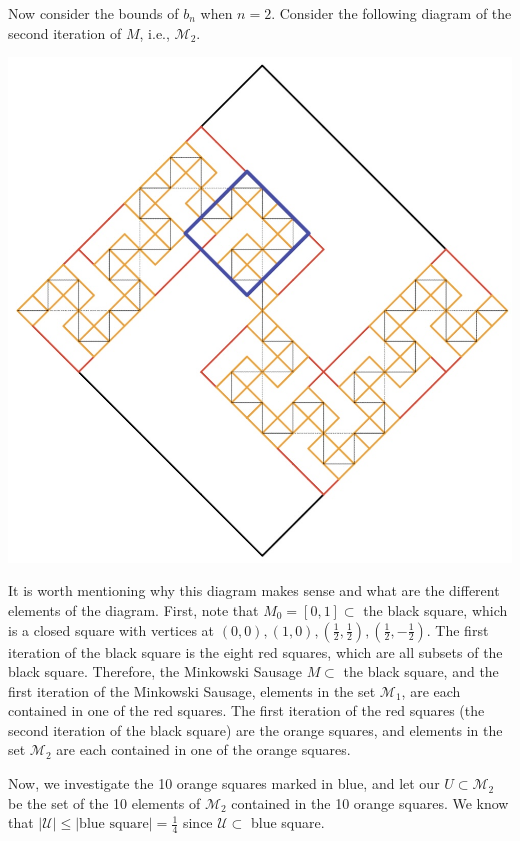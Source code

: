 Now consider the bounds of \(b_n\) when \(n = 2\). Consider the following diagram of the second iteration of \(M\), i.e., \(\mathcal{M}_2\).

\begin{center}
    \includegraphics[scale=0.3]{solutions/section-5-0/diag-5-0-5-2.jpg}
\end{center}

It is worth mentioning why this diagram makes sense and what are the different elements of the diagram. First, note that \(M_0 = [0, 1] \subset\) the black square, which is a closed square with vertices at \((0, 0), (1, 0), \left(\frac{1}{2}, \frac{1}{2}\right), \left(\frac{1}{2}, -\frac{1}{2}\right)\). The first iteration of the black square is the eight red squares, which are all subsets of the black square. Therefore, the Minkowski Sausage \(M \subset\) the black square, and the first iteration of the Minkowski Sausage, elements in the set \(\mathcal{M}_1\), are each contained in one of the red squares. The first iteration of the red squares (the second iteration of the black square) are the orange squares, and elements in the set \(\mathcal{M}_2\) are each contained in one of the orange squares.

Now, we investigate the 10 orange squares marked in blue, and let our \(U \subset \mathcal{M}_2\) be the set of the 10 elements of \(\mathcal{M}_2\) contained in the 10 orange squares. We know that \(|\mathcal{U}| \leq |\text{blue square}| = \frac{1}{4}\) since \(\mathcal{U} \subset \) blue square.

